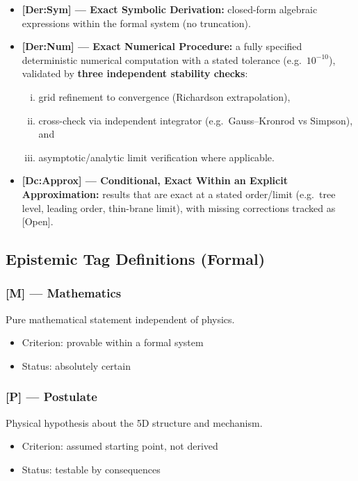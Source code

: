 \begin{itemize}
\item \textbf{[Der:Sym] --- Exact Symbolic Derivation:}
closed-form algebraic expressions within the formal system (no truncation).

\item \textbf{[Der:Num] --- Exact Numerical Procedure:}
a fully specified deterministic numerical computation with a stated tolerance (e.g.\ $10^{-10}$),
validated by \textbf{three independent stability checks}:
\begin{enumerate}[(i)]
\item grid refinement to convergence (Richardson extrapolation),
\item cross-check via independent integrator (e.g.\ Gauss--Kronrod vs Simpson), and
\item asymptotic/analytic limit verification where applicable.
\end{enumerate}

\item \textbf{[Dc:Approx] --- Conditional, Exact Within an Explicit Approximation:}
results that are exact at a stated order/limit (e.g.\ tree level, leading order, thin-brane limit),
with missing corrections tracked as [Open].
\end{itemize}

\subsection*{Epistemic Tag Definitions (Formal)}

\subsubsection*{[M] --- Mathematics}
Pure mathematical statement independent of physics.
\begin{itemize}
\item Criterion: provable within a formal system
\item Status: absolutely certain
\end{itemize}

\subsubsection*{[P] --- Postulate}
Physical hypothesis about the 5D structure and mechanism.
\begin{itemize}
\item Criterion: assumed starting point, not derived
\item Status: testable by consequences
\end{itemize}

